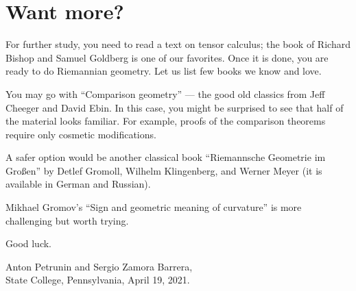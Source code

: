 \chapter*{Want more?}



For further study, you need to read a text on tensor calculus;
the book of Richard Bishop and Samuel Goldberg \cite{bishop-goldberg} is one of our favorites.
Once it is done, you are ready to do Riemannian geometry.
Let us list few books we know and love.

You may go with  ``Comparison geometry'' \cite{cheeger-ebin} --- the good old classics from Jeff Cheeger and David Ebin. 
In this case, you might be surprised to see that half of the material looks familiar.
For example, proofs of the comparison theorems require only cosmetic modifications.

A safer option would be another classical book ``Riemannsche Geometrie im Großen'' \cite{gromoll-klingenberg-meyer} by 
Detlef Gromoll,
Wilhelm Klingenberg, 
and  Werner Meyer (it is available in German and Russian).

Mikhael Gromov's ``Sign and geometric meaning of curvature'' \cite{gromov-1991} is more challenging but worth trying.

Good luck.

\begin{flushright}
Anton Petrunin and Sergio Zamora Barrera,\\
State College, Pennsylvania, April 19, 2021.
\end{flushright}
